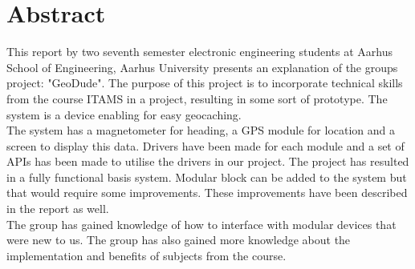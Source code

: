 \chapter{Abstract}
This report by two seventh semester electronic engineering students at Aarhus School of Engineering, Aarhus University presents an explanation of the groups project: "GeoDude". The purpose of this project is to incorporate technical skills from the course ITAMS in a project, resulting in some sort of prototype. The system is a device enabling for easy geocaching.\\
The system has a magnetometer for heading, a GPS module for location and a screen to display this data. Drivers have been made for each module and a set of APIs has been made to utilise the drivers in our project. The project has resulted in a fully functional basis system. Modular block can be added to the system but that would require some improvements. These improvements have been described in the report as well.\\
The group has gained knowledge of how to interface with modular devices that were new to us. The group has also gained more knowledge about the implementation and benefits of subjects from the course.
